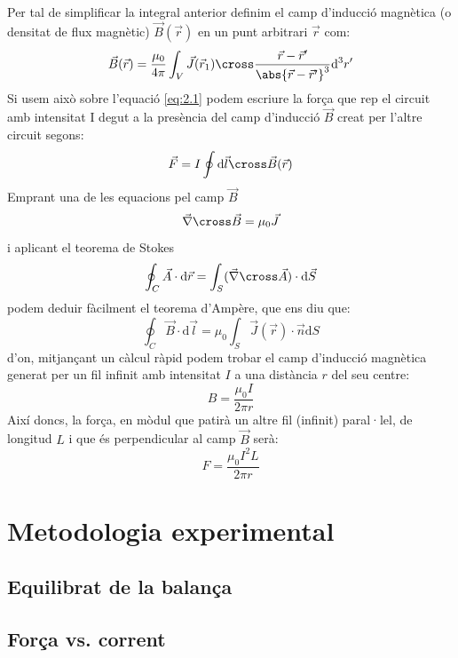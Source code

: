 \documentclass[a4paper,10.5pt]{report}
\begin{document}
Per tal de simplificar la integral anterior definim el camp d'inducció magnètica (o densitat de flux magnètic) $\vec{B}(\vec{r})$ en un punt arbitrari $\vec{r}$ com:
\begin{equation}
	\vec{B}(\vec{r}) = \frac{\mu_0}{4\pi} \int_V \vec{J}(\vec{r}_1)\cross\frac{\vec{r}-\vec{r}'}{\abs{\vec{r}-\vec{r}'}^3}\mathrm{d}^3r'
\end{equation} 
Si usem això sobre l'equació \eqref{eq:2.1} podem escriure la força que rep el circuit amb intensitat I degut a la presència del camp d'inducció $\vec{B}$ creat per l'altre circuit segons:
\begin{equation}
	\vec{F} = I \oint \mathrm{d}\vec{l}\cross\vec{B}(\vec{r})
\end{equation}
Emprant una de les equacions pel camp $\vec{B}$
\begin{equation}
	\vec{\nabla}\cross \vec{B} = \mu_0 \vec{J}
\end{equation}
i aplicant el teorema de Stokes
\begin{equation}
	\oint_C \vec{A} \cdot \mathrm{d}\vec{r} = \int_S (\vec{\nabla}\cross \vec{A})\cdot \mathrm{d}\vec{S}
\end{equation}
podem deduir fàcilment el teorema d'Ampère, que ens diu que:
\begin{equation}
	\oint_C\vec{B}\cdot\mathrm{d}\vec{l} = \mu_0\int_S\vec{J}(\vec{r})\cdot\vec{n}\mathrm{d}S
\end{equation}
d'on, mitjançant un càlcul ràpid podem trobar el camp d'inducció magnètica generat per un fil infinit amb intensitat $I$ a una distància $r$ del seu centre:
\begin{equation}
	B = \frac{\mu_0 I}{2\pi r}
\end{equation}
Així doncs, la força, en mòdul que patirà un altre fil (infinit) paral·lel, de longitud $L$ i que és perpendicular al camp $\vec{B}$ serà:
\begin{equation}
	F = \frac{\mu_0 I^2L}{2\pi r}
\end{equation} 
\section{Metodologia experimental}

\subsection{Equilibrat de la balança}
\subsection{Força vs. corrent}
\end{document}
